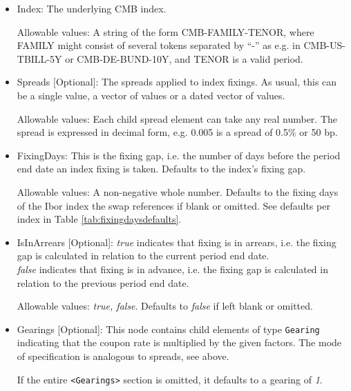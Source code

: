 \begin{itemize}
\item Index: The underlying CMB index.

Allowable values: A string of the form CMB-FAMILY-TENOR, where FAMILY might consist of several tokens separated by ``-'' as e.g. in CMB-US-TBILL-5Y or CMB-DE-BUND-10Y, and TENOR is a valid period.

\item Spreads [Optional]: The spreads applied to index fixings. As usual, this can be a single value, a vector of values or a dated vector of
  values.
  
  Allowable values: Each child spread element can take any real number. The spread is expressed in decimal form, e.g. 0.005 is
  a spread of 0.5\% or 50 bp. 
    
\item FixingDays: This is the fixing gap, i.e. the number of days
  before the period end date an index fixing is taken. Defaults to the index's fixing gap.
  
    Allowable values: A non-negative whole number.  Defaults to the fixing days of the Ibor index the swap references if blank or omitted. See defaults per index in Table \ref{tab:fixingdaysdefaults}.

\item IsInArrears [Optional]:  \emph{true} indicates that  fixing is in arrears, 
  i.e. the fixing gap is calculated in relation to the current period
  end date.\\ \emph{false} indicates that  fixing is in advance,
  i.e. the fixing gap is calculated in relation to the previous period
  end date.
  
Allowable values:  \emph{true, false}. Defaults to \emph{false} if left blank or omitted.
    
\item Gearings [Optional]: This node contains child elements of type \lstinline!Gearing! indicating that the coupon rate is
  multiplied by the given factors. The mode of specification is analogous to spreads, see above.
  
  If the entire {\tt <Gearings>} section is omitted, it defaults to a gearing of \emph{1}.

\end{itemize}

